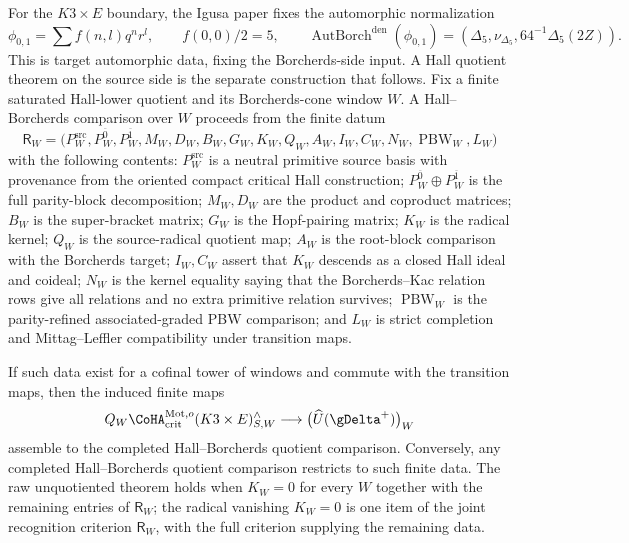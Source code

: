 \begin{theorem}
\label{thm:bps-positive-igusa-boundary}
For the \(K3\times E\) boundary, the Igusa paper fixes the automorphic
normalization
\[
\phi_{0,1}=\sum f(n,l)q^nr^l,
\qquad
f(0,0)/2=5,
\qquad
\operatorname{AutBorch}^{\mathrm{den}}(\phi_{0,1})
=
(\Delta_5,\nu_{\Delta_5},64^{-1}\Delta_5(2Z)).
\]
This is target automorphic data, fixing the Borcherds-side input. A
Hall quotient theorem on the source side is the separate construction
that follows. Fix a finite saturated Hall-lower quotient and its
Borcherds-cone window $W$. A Hall--Borcherds comparison over $W$
proceeds from the finite datum
\[
\mathsf R_W=
\bigl(P_W^{\mathrm{src}},P_W^{\overline 0},P_W^{\overline 1},
M_W,D_W,B_W,G_W,K_W,Q_W,A_W,
I_W,C_W,N_W,\operatorname{PBW}_W,L_W\bigr)
\]
with the following contents: \(P_W^{\mathrm{src}}\) is a neutral
primitive source basis with provenance from the oriented compact
critical Hall construction; \(P_W^{\overline 0}\oplus
P_W^{\overline 1}\) is the full parity-block decomposition; \(M_W,D_W\)
are the product and coproduct matrices; \(B_W\) is the super-bracket
matrix; \(G_W\) is the Hopf-pairing matrix; \(K_W\) is the radical
kernel; \(Q_W\) is the source-radical quotient map; \(A_W\) is the
root-block comparison with the Borcherds target; \(I_W,C_W\) assert
that \(K_W\) descends as a closed Hall ideal and coideal; \(N_W\) is the
kernel equality saying that the Borcherds--Kac relation rows give all
relations and no extra primitive relation survives; \(\operatorname{PBW}_W\)
is the parity-refined associated-graded PBW comparison; and \(L_W\) is
strict completion and Mittag--Leffler compatibility under transition
maps.

If such data exist for a cofinal tower of windows and commute with the
transition maps, then the induced finite maps
\[
Q_W\CoHA^{\Mot,o}_{\mathrm{crit}}(K3\times E)^{\wedge}_{S,W}
\longrightarrow
\bigl(\widehat U(\gDelta^+)\bigr)_W
\]
assemble to the completed Hall--Borcherds quotient comparison.
Conversely, any completed Hall--Borcherds quotient comparison restricts
to such finite data. The raw unquotiented theorem holds when $K_W = 0$ for every $W$
together with the remaining entries of $\mathsf R_W$; the radical
vanishing $K_W = 0$ is one item of the joint recognition criterion
$\mathsf R_W$, with the full criterion supplying the remaining
data.
\end{theorem}


